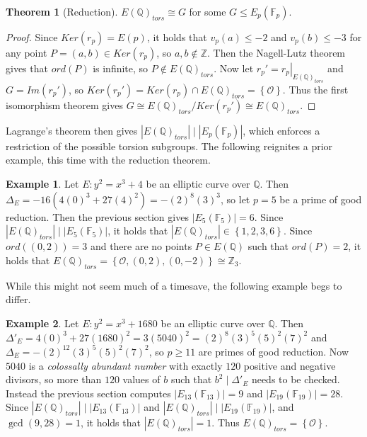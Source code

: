 \documentclass{article}
\newcommand{\F}{\mathbb{F}}
\newcommand{\Z}{\mathbb{Z}}
\newcommand{\Q}{\mathbb{Q}}
\newcommand{\val}[1]{\left. #1 \right\rvert}
\newcommand{\rb}[1]{\left( #1 \right)}
\newcommand{\cb}[1]{\left\{ #1 \right\}}
\newcommand{\abs}[1]{\left\lvert #1 \right\rvert}
\theoremstyle{definition}\newtheorem*{definition}{Definition}
\theoremstyle{definition}\newtheorem*{example}{Example}
\theoremstyle{definition}\newtheorem*{remark}{Remark}
\newtheorem{theorem}[proposition]{Theorem}
\begin{document}
\begin{theorem}[Reduction]
$ E\rb{\Q}_{tors} \cong G $ for some $ G \le E_p\rb{\F_p} $.
\end{theorem}

\begin{proof}
Since $ Ker\rb{r_p} = E\rb{p} $, it holds that $ v_p\rb{a} \le -2 $ and $ v_p\rb{b} \le -3 $ for any point $ P = \rb{a, b} \in Ker\rb{r_p} $, so $ a, b \notin \Z $. Then the Nagell-Lutz theorem gives that $ ord\rb{P} $ is infinite, so $ P \notin E\rb{\Q}_{tors} $. Now let $ r_p' = \val{r_p}_{E\rb{\Q}_{tors}} $ and $ G = Im\rb{r_p'} $, so $ Ker\rb{r_p'} = Ker\rb{r_p} \cap E\rb{\Q}_{tors} = \cb{\mathcal{O}} $. Thus the first isomorphism theorem gives $ G \cong E\rb{\Q}_{tors} / Ker\rb{r_p'} \cong E\rb{\Q}_{tors} $.
\end{proof}

Lagrange's theorem then gives $ \abs{E\rb{\Q}_{tors}} \mid \abs{E_p\rb{\F_p}} $, which enforces a restriction of the possible torsion subgroups. The following reignites a prior example, this time with the reduction theorem.

\begin{example}
Let $ E : y^2 = x^3 + 4 $ be an elliptic curve over $ \Q $. Then $ \Delta_E = -16\rb{4\rb{0}^3 + 27\rb{4}^2} = -\rb{2}^8\rb{3}^3 $, so let $ p = 5 $ be a prime of good reduction. Then the previous section gives $ \abs{E_5\rb{\F_5}} = 6 $. Since $ \abs{E\rb{\Q}_{tors}} \mid \abs{E_5\rb{\F_5}} $, it holds that $ \abs{E\rb{\Q}_{tors}} \in \cb{1, 2, 3, 6} $. Since $ ord\rb{\rb{0, 2}} = 3 $ and there are no points $ P \in E\rb{\Q} $ such that $ ord\rb{P} = 2 $, it holds that $ E\rb{\Q}_{tors} = \cb{\mathcal{O}, \rb{0, 2}, \rb{0, -2}} \cong \Z_3 $.
\end{example}

While this might not seem much of a timesave, the following example begs to differ.

\begin{example}
Let $ E : y^2 = x^3 + 1680 $ be an elliptic curve over $ \Q $. Then $ \Delta'_E = 4\rb{0}^3 + 27\rb{1680}^2 = 3\rb{5040}^2 = \rb{2}^8\rb{3}^5\rb{5}^2\rb{7}^2 $ and $ \Delta_E = -\rb{2}^{12}\rb{3}^5\rb{5}^2\rb{7}^2 $, so $ p \ge 11 $ are primes of good reduction. Now $ 5040 $ is a \emph{colossally abundant number} with exactly $ 120 $ positive and negative divisors, so more than $ 120 $ values of $ b $ such that $ b^2 \mid \Delta'_E $ needs to be checked. Instead the previous section computes $ \abs{E_{13}\rb{\F_{13}}} = 9 $ and $ \abs{E_{19}\rb{\F_{19}}} = 28 $. Since $ \abs{E\rb{\Q}_{tors}} \mid \abs{E_{13}\rb{\F_{13}}} $ and $ \abs{E\rb{\Q}_{tors}} \mid \abs{E_{19}\rb{\F_{19}}} $, and $ \gcd\rb{9, 28} = 1 $, it holds that $ \abs{E\rb{\Q}_{tors}} = 1 $. Thus $ E\rb{\Q}_{tors} = \cb{\mathcal{O}} $.
\end{example}
\end{document}
